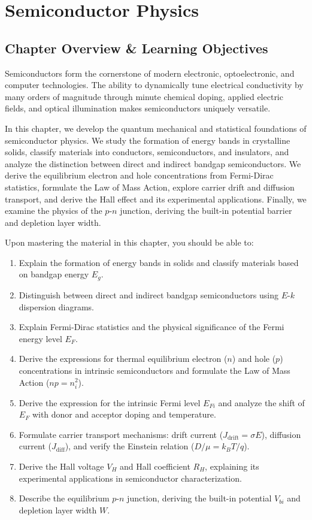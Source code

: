 \chapter{Semiconductor Physics}
\label{chap:semiconductors}

\section{Chapter Overview \& Learning Objectives}
Semiconductors form the cornerstone of modern electronic, optoelectronic, and computer technologies. The ability to dynamically tune electrical conductivity by many orders of magnitude through minute chemical doping, applied electric fields, and optical illumination makes semiconductors uniquely versatile.

In this chapter, we develop the quantum mechanical and statistical foundations of semiconductor physics. We study the formation of energy bands in crystalline solids, classify materials into conductors, semiconductors, and insulators, and analyze the distinction between direct and indirect bandgap semiconductors. We derive the equilibrium electron and hole concentrations from Fermi-Dirac statistics, formulate the Law of Mass Action, explore carrier drift and diffusion transport, and derive the Hall effect and its experimental applications. Finally, we examine the physics of the $p$-$n$ junction, deriving the built-in potential barrier and depletion layer width.

\begin{important}
Upon mastering the material in this chapter, you should be able to:
\begin{enumerate}
    \item Explain the formation of energy bands in solids and classify materials based on bandgap energy $E_g$.
    \item Distinguish between direct and indirect bandgap semiconductors using $E$-$k$ dispersion diagrams.
    \item Explain Fermi-Dirac statistics and the physical significance of the Fermi energy level $E_F$.
    \item Derive the expressions for thermal equilibrium electron ($n$) and hole ($p$) concentrations in intrinsic semiconductors and formulate the Law of Mass Action ($n p = n_i^2$).
    \item Derive the expression for the intrinsic Fermi level $E_{Fi}$ and analyze the shift of $E_F$ with donor and acceptor doping and temperature.
    \item Formulate carrier transport mechanisms: drift current ($J_{\text{drift}} = \sigma E$), diffusion current ($J_{\text{diff}}$), and verify the Einstein relation ($D/\mu = k_B T / q$).
    \item Derive the Hall voltage $V_H$ and Hall coefficient $R_H$, explaining its experimental applications in semiconductor characterization.
    \item Describe the equilibrium $p$-$n$ junction, deriving the built-in potential $V_{bi}$ and depletion layer width $W$.
\end{enumerate}
\end{important}

